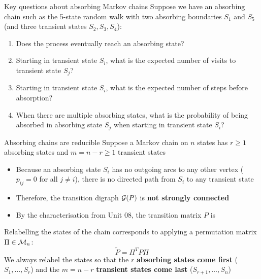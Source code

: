 \documentclass[aspectratio=169]{beamer}\usepackage[]{graphicx}\usepackage[]{xcolor}
\begin{document}
\begin{frame}{Key questions about absorbing Markov chains}
Suppose we have an absorbing chain such as the 5-state random walk with two absorbing boundaries $S_1$ and $S_5$ (and three transient states $S_2, S_3, S_4$):
\begin{center}
\end{center}
\vfill
\begin{enumerate}
\item Does the process eventually reach an absorbing state?
\item Starting in transient state $S_i$, what is the expected number of visits to transient state $S_j$?
\item Starting in transient state $S_i$, what is the expected number of steps before absorption?
\item When there are multiple absorbing states, what is the probability of being absorbed in absorbing state $S_j$ when starting in transient state $S_i$?
\end{enumerate}
\end{frame}



\begin{frame}{Absorbing chains are reducible}
Suppose a Markov chain on $n$ states has $r \ge 1$ absorbing states and $m = n - r \ge 1$ transient states
\vfill
\begin{itemize}
\item Because an absorbing state $S_i$ has no outgoing arcs to any other vertex ($p_{ij} = 0$ for all $j \neq i$), there is no directed path from $S_i$ to any transient state
\item Therefore, the transition digraph $\mathcal{G}(P)$ is \textbf{not strongly connected}
\item By the characterisation from Unit 08, the transition matrix $P$ is 
\end{itemize}
\vfill
Relabelling the states of the chain corresponds to applying a permutation matrix $\Pi \in \mathcal{M}_n$:
\[
\tilde{P} = \Pi^T P \Pi
\]
We always relabel the states so that the $r$ \textbf{absorbing states come first} ($S_1, \ldots, S_r$) and the $m = n - r$ \textbf{transient states come last} ($S_{r+1}, \ldots, S_n$)
\end{frame}
\end{document}
